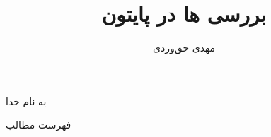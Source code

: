 \documentclass[aspectratio=169]{beamer}
\title{بررسی \lr{Context Manager}ها در پایتون}
\author{مهدی حق‌وردی}
\institute{
    \\
    \texttt{[image: logos/logo]}
}
\date{}
\begin{document}
    
    \begin{frame}[plain]
        \begin{center}
            به نام خدا
        \end{center}
        
        \maketitle
        
        
    \end{frame}
    
    \setcounter{framenumber}{0}
    
    
    \raggedleft
    
    \begin{frame}{فهرست مطالب}
        \begin{flushright}
            \tableofcontents
        \end{flushright}
    \end{frame}
    
    
    
    
\end{document}
